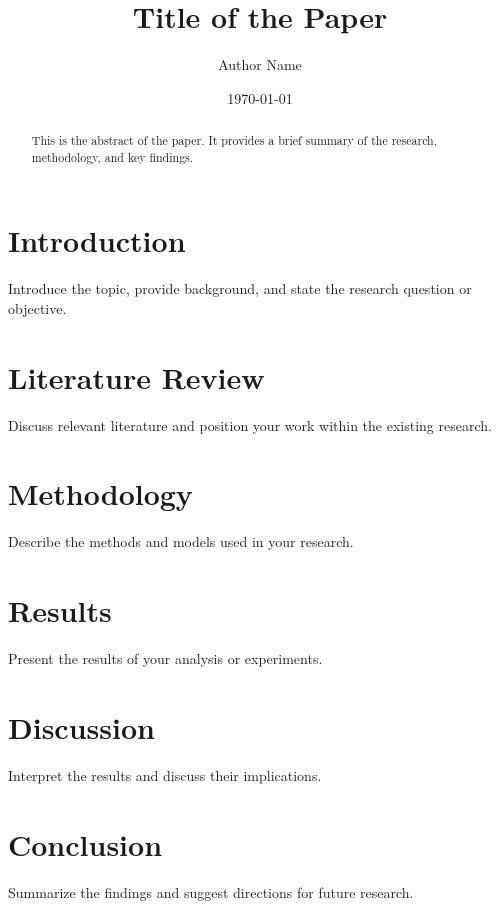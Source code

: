 \documentclass[12pt]{article}
\title{Title of the Paper}
\author{Author Name}
\date{\today}
\begin{document}
\maketitle

\begin{abstract}
This is the abstract of the paper. It provides a brief summary of the research, methodology, and key findings.
\end{abstract}

\section{Introduction}
Introduce the topic, provide background, and state the research question or objective.

\section{Literature Review}
Discuss relevant literature and position your work within the existing research.

\section{Methodology}
Describe the methods and models used in your research.

\section{Results}
Present the results of your analysis or experiments.

\section{Discussion}
Interpret the results and discuss their implications.

\section{Conclusion}
Summarize the findings and suggest directions for future research.

\end{document}
